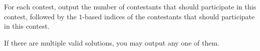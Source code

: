 
    For each contest,
    output the number of contestants that should participate in this contest,
    followed by the $1$-based indices of the contestants that should participate in this contest.

    If there are multiple valid solutions, you may output any one of them.

